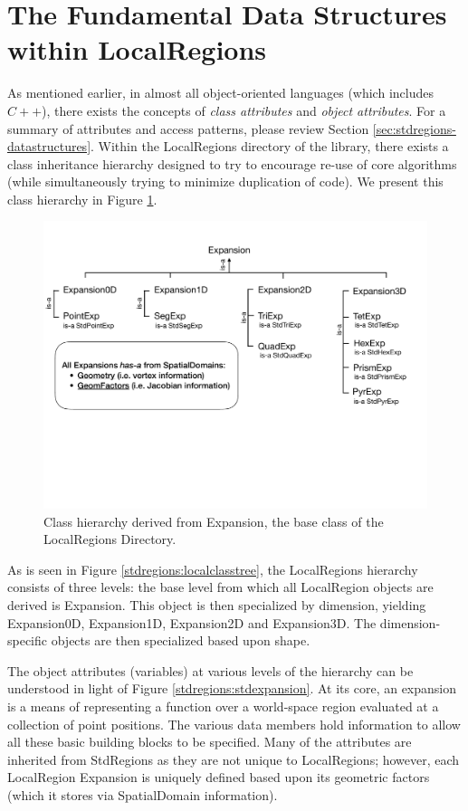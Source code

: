 %
\section{The Fundamental Data Structures within LocalRegions}

As mentioned earlier, in almost all object-oriented languages (which includes $C++$), there exists the concepts of {\em class attributes} and {\em object attributes}.   For a summary of attributes and access patterns, please review Section \ref{sec:stdregions-datastructures}.
Within the LocalRegions directory of the library, there exists a class inheritance hierarchy designed to try to encourage re-use of core
algorithms (while simultaneously trying to minimize duplication of code).  We present this class hierarchy in Figure \ref{localregions:localclasstree}.


\begin{figure}[htb]
\centering
\includegraphics[width=6in]{img/expansiontree.pdf}
\caption{Class hierarchy derived from Expansion, the base class of the LocalRegions Directory.}
\label{localregions:localclasstree}
\end{figure}

As is seen in Figure \ref{stdregions:localclasstree}, the LocalRegions hierarchy consists of three levels:  the base level from which all
LocalRegion objects are derived is Expansion.   This object is then specialized by dimension, yielding Expansion0D, 
Expansion1D, Expansion2D and Expansion3D.  The dimension-specific objects are then specialized based upon
shape.  

The object attributes (variables) at various levels of the hierarchy can be understood in light of Figure \ref{stdregions:stdexpansion}.
At its core, an expansion is a means of representing a function over a world-space region evaluated at a collection of point positions.
The various data members hold information to allow all these basic building blocks to be specified.  Many of the attributes are 
inherited from StdRegions as they are not unique to LocalRegions; however, each LocalRegion Expansion is uniquely defined based
upon its geometric factors (which it stores via SpatialDomain information).


